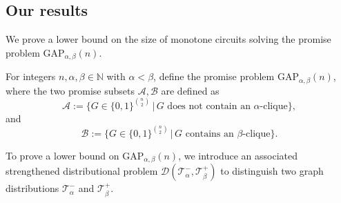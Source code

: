 \subsection{Our results}


We prove a lower bound on the size of monotone circuits solving the promise problem $\mathrm{GAP}_{\alpha, \beta}(n)$.

\begin{definition}
    For integers $n, \alpha, \beta\in \mathbb{N}$ with $ \alpha < \beta$, define the promise problem $\mathrm{GAP}_{\alpha, \beta}(n)$, where the two promise subsets $\mathcal{A}, \mathcal{B}$ are defined as
    $$\mathcal{A} := \{G \in \{0, 1\}^{\binom{n}{2}}\,|\, G \text{ does not contain an } \alpha \text{-clique}\},$$
    and
    $$\mathcal{B} := \{G \in \{0, 1\}^{\binom{n}{2}} \,|\, G \text{ contains an } \beta \text{-clique}\}.$$
\end{definition}


To prove a lower bound on $\mathrm{GAP}_{\alpha, \beta}(n)$, we introduce an associated strengthened distributional problem $\mathcal{D}(\mathcal{T}^-_\alpha, \mathcal{T}^+_\beta)$ to distinguish two graph distributions $\mathcal{T}^-_\alpha$ and $\mathcal{T}^+_\beta$.

